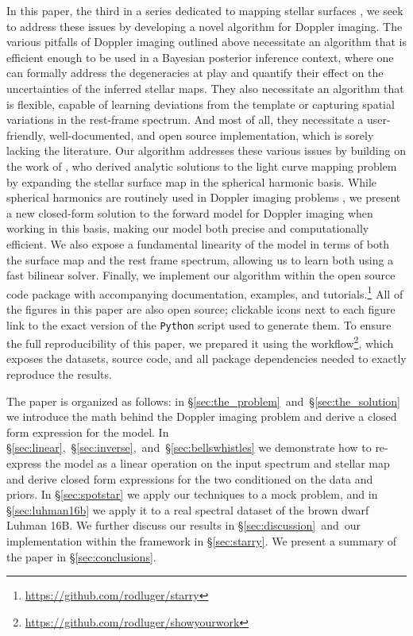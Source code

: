 \documentclass[modern]{aastex631}
\begin{document}
In this paper, the third in a series dedicated to mapping stellar surfaces \citep{Luger2021a,Luger2021b}, we seek to address these issues by developing a novel algorithm for Doppler imaging.
The various pitfalls of Doppler imaging outlined above necessitate an algorithm that is efficient enough to be used in a Bayesian posterior inference context, where one can formally address the degeneracies at play and quantify their effect on the uncertainties of the inferred stellar maps.
They also necessitate an algorithm that is flexible, capable of learning deviations from the template or capturing spatial variations in the rest-frame spectrum.
And most of all, they necessitate a user-friendly, well-documented, and open source implementation, which is sorely lacking the literature.
Our algorithm addresses these various issues by building on the work of \citet{Luger2019}, who derived analytic solutions to the light curve mapping problem by expanding the stellar surface map in the spherical harmonic basis.
While spherical harmonics are routinely used in Doppler imaging problems \citep{Deutsch1958,Deutsch1970,Falk1974,Donati2006,Kochukhov2014}, we present a new closed-form solution to the forward model for Doppler imaging when working in this basis, making our model both precise and computationally efficient.
We also expose a fundamental linearity of the model in terms of both the surface map and the rest frame spectrum, allowing us to learn both using a fast bilinear solver.
Finally, we implement our algorithm within the open source \starry code package with accompanying documentation, examples, and tutorials.\footnote{\url{https://github.com/rodluger/starry}}
All of the figures in this paper are also open source; clickable \GitHubIconBlue icons next to each figure link to the exact version of the \texttt{Python} script used to generate them.
To ensure the full reproducibility of this paper, we prepared it using the \showyourwork workflow\footnote{\url{https://github.com/rodluger/showyourwork}}, which exposes the datasets, source code, and all package dependencies needed to exactly reproduce the results.

The paper is organized as follows: in \S\ref{sec:the_problem}~and~\S\ref{sec:the_solution} we introduce the math behind the Doppler imaging problem and derive a closed form expression for the model. 
In \S\ref{sec:linear},~\S\ref{sec:inverse},~and~\S\ref{sec:bellswhistles} we demonstrate how to re-express the model as a linear operation on the input spectrum and stellar map and derive closed form expressions for the two conditioned on the data and priors.
In \S\ref{sec:spotstar} we apply our techniques to a mock problem, and in \S\ref{sec:luhman16b} we apply it to a real spectral dataset of the brown dwarf Luhman 16B.
We further discuss our results in \S\ref{sec:discussion}~and~our implementation within the \starry framework in \S\ref{sec:starry}.
We present a summary of the paper in \S\ref{sec:conclusions}. 
\end{document}
